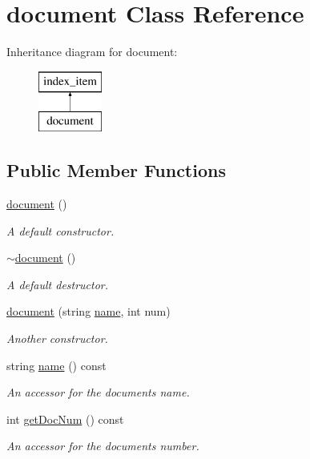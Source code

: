 \hypertarget{classdocument}{}\section{document Class Reference}
\label{classdocument}
Inheritance diagram for document\+:\begin{figure}[H]
\begin{center}
\leavevmode
\includegraphics[height=2.000000cm]{classdocument}
\end{center}
\end{figure}
\subsection*{Public Member Functions}
\begin{DoxyCompactItemize}
\item 
\hyperlink{classdocument_af1a85718219b8da6f1befaac0bf87989}{document} ()
\begin{DoxyCompactList}\small\item\em A default constructor. \end{DoxyCompactList}\item 
\mbox{\label{classdocument_afff6a78ede7767d8cbc0cb4566ae64da}} 
\hyperlink{classdocument_afff6a78ede7767d8cbc0cb4566ae64da}{$\sim$document} ()
\begin{DoxyCompactList}\small\item\em A default destructor. \end{DoxyCompactList}\item 
\hyperlink{classdocument_af8e0d4d3a3eeeac31022ebe0e76c5571}{document} (string \hyperlink{classdocument_a19e6fd5bb89537dc566df2eac658e5a6}{name}, int num)
\begin{DoxyCompactList}\small\item\em Another constructor. \end{DoxyCompactList}\item 
string \hyperlink{classdocument_a19e6fd5bb89537dc566df2eac658e5a6}{name} () const
\begin{DoxyCompactList}\small\item\em An accessor for the document\textquotesingle{}s name. \end{DoxyCompactList}\item 
int \hyperlink{classdocument_ac8755191462341296e2be04db6f8f4e5}{get\+Doc\+Num} () const
\begin{DoxyCompactList}\small\item\em An accessor for the document\textquotesingle{}s number. \end{DoxyCompactList}\end{DoxyCompactItemize}
